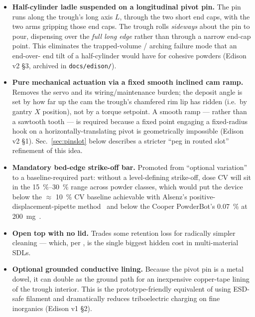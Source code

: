 \documentclass[11pt,a4paper]{article}
\begin{document}
\begin{itemize}[leftmargin=*]
  \item \textbf{Half-cylinder ladle suspended on a longitudinal pivot pin.}
    The pin runs along the trough's long axis $L$, through the two short
    end caps, with the two arms gripping those end caps. The trough rolls
    \emph{sideways} about the pin to pour, dispensing over the
    \emph{full long edge} rather than through a narrow end-cap point. This
    eliminates the trapped-volume / arching failure mode that an end-over-
    end tilt of a half-cylinder would have for cohesive powders (Edison v2
    \S3, archived in \texttt{docs/edison/}).
  \item \textbf{Pure mechanical actuation via a fixed smooth inclined cam
    ramp.} Removes the servo and its wiring/maintenance burden; the deposit
    angle is set by how far up the cam the trough's chamfered rim lip has
    ridden (i.e.\ by gantry $X$ position), not by a torque setpoint. A
    smooth ramp --- rather than a sawtooth tooth --- is required because a
    fixed point engaging a fixed-radius hook on a horizontally-translating
    pivot is geometrically impossible (Edison v2 \S1).
    Sec.~\ref{sec:pinslot} below describes a stricter ``peg in routed slot''
    refinement of this idea.
  \item \textbf{Mandatory bed-edge strike-off bar.} Promoted from
    ``optional variation'' to a baseline-required part: without a
    level-defining strike-off, dose CV will sit in the
    \SIrange{15}{30}{\percent} range across powder classes, which would
    put the device below the \(\approx\) \SI{10}{\percent} CV baseline
    achievable with Alsenz's positive-displacement-pipette
    method~\cite{alsenz2011powderpickinganinexpensive} and below the
    Cooper PowderBot's \SI{0.07}{\percent} at
    \SI{200}{\milli\gram}~\cite{jiang2023autonomousbiomimeticsolid}.
  \item \textbf{Open top with no lid.} Trades some retention loss for
    radically simpler cleaning --- which, per
    \cite{tom2024selfdrivinglaboratoriesfor,carruthers2025amobilerobotic},
    is the single biggest hidden cost in multi-material SDLs.
  \item \textbf{Optional grounded conductive lining.} Because the pivot
    pin is a metal dowel, it can double as the ground path for an
    inexpensive copper-tape lining of the trough interior. This is the
    prototype-friendly equivalent of using ESD-safe filament and
    dramatically reduces triboelectric charging on fine inorganics
    (Edison v1 \S2).
\end{itemize}
\end{document}
